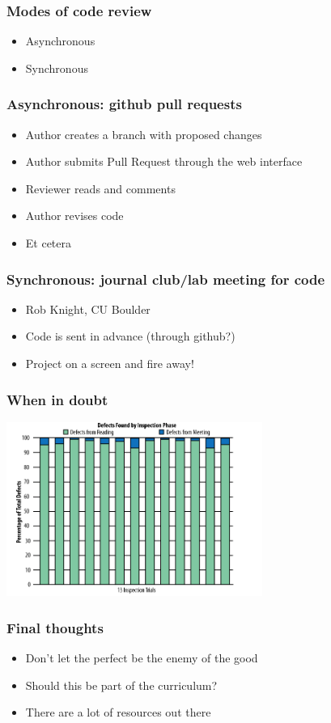 \documentclass{beamer}
\begin{document}
\begin{frame}
\frametitle{Modes of code review}
\begin{itemize}
\pause
\item
Asynchronous 
\pause
\item
Synchronous 
\end{itemize}
\end{frame}

\begin{frame}
\frametitle{Asynchronous: github pull requests}
\begin{itemize}
\pause
\item
Author creates a branch with proposed changes 
\pause
\item
Author submits Pull Request through the web interface
\pause
\item
Reviewer reads and comments
\pause
\item
Author revises code
\pause
\item
Et cetera
\end{itemize}
\end{frame}

\begin{frame}
\frametitle{Synchronous: journal club/lab meeting for code}
\begin{itemize}
\pause
\item
Rob Knight, CU Boulder \footnotemark[1]
\pause
\item
Code is sent in advance (through github?)
\pause
\item 
Project on a screen and fire away!
\end{itemize}
\end{frame}

\begin{frame}
\frametitle{When in doubt}
\includegraphics[height=5.7cm]{figures/review_meetings.png}
\end{frame}

\begin{frame}
\frametitle{Final thoughts}
\begin{itemize}
\pause
\item
Don't let the perfect be the enemy of the good

\pause
\item
Should this be part of the curriculum?

\pause
\item
There are a lot of resources out there


\end{itemize}
\end{frame}
\end{document}
